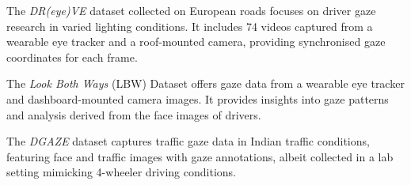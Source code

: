 The \textit{DR(eye)VE }dataset \cite{alletto2016dr6} collected on European roads focuses on driver gaze research in varied lighting conditions. It includes 74 videos captured from a wearable eye tracker and a roof-mounted camera, providing synchronised gaze coordinates for each frame.

The \textit{Look Both Ways} (LBW) Dataset \cite{Isaac7} offers gaze data from a wearable eye tracker and dashboard-mounted camera images. It provides insights into gaze patterns and analysis derived from the face images of drivers.

The \textit{DGAZE} dataset \cite{Dua20} captures traffic gaze data in Indian traffic conditions, featuring face and traffic images with gaze annotations, albeit collected in a lab setting mimicking 4-wheeler driving conditions.